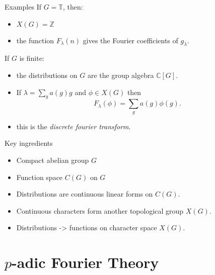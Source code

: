 \documentclass[
  ignorenonframetext,
]{beamer}
\providecommand{\tightlist}{%
  \setlength{\itemsep}{0pt}\setlength{\parskip}{0pt}}
\begin{document}
\begin{frame}{Examples}
\protect\hypertarget{examples}{}
If \(G=\mathbb{T}\), then:

\begin{itemize}
\tightlist
\item
  \(X(G)=\mathbb{Z}\)
\item
  the function \(F_{\lambda}(n)\) gives the Fourier coefficients of
  \(g_{\lambda}\).
\end{itemize}

If \(G\) is finite:

\begin{itemize}
\tightlist
\item
  the distributions on \(G\) are the group algebra \(\mathbb{C}[G]\).
\item
  If \(\lambda=\sum_{g}a(g)g\) and \(\phi\in X(G)\) then \[
  F_{\lambda}(\phi)=\sum_{g} a(g)\phi(g).
  \]
\item
  this is the \emph{discrete fourier transform}.
\end{itemize}
\end{frame}

\begin{frame}{Key ingredients}
\protect\hypertarget{key-ingredients}{}
\begin{itemize}
\tightlist
\item
  Compact abelian group \(G\)
\item
  Function space \(C(G)\) on \(G\)
\item
  Distributions are continuous linear forms on \(C(G)\).
\item
  Continuous characters form another topological group \(X(G)\).
\item
  Distributions -\textgreater{} functions on character space \(X(G)\).
\end{itemize}
\end{frame}

\hypertarget{p-adic-fourier-theory}{%
\section{\texorpdfstring{\(p\)-adic Fourier
Theory}{p-adic Fourier Theory}}\label{p-adic-fourier-theory}}
\end{document}
